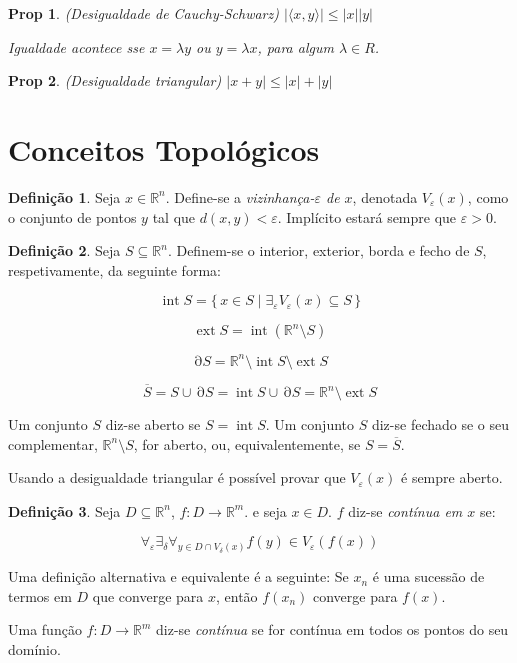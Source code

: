 \documentclass{article}
\DeclareMathOperator{\interior}{int}
\DeclareMathOperator{\exterior}{ext}
\DeclareMathOperator{\border}{\partial}
\newcommand{\R}{\mathbb{R}}
\newtheorem{prop}{Prop}
\theoremstyle{definition}
\newtheorem*{definition*}{Definição}
\begin{document}
	\begin{prop}
	(Desigualdade de Cauchy-Schwarz) $\lvert \langle x, y \rangle \rvert \leq \lvert x \rvert \lvert y \rvert$
	
	Igualdade acontece sse $x = \lambda y$ ou $y = \lambda x$, para algum $\lambda \in R$.
	\end{prop}
	
	\begin{prop}
	(Desigualdade triangular) $\lvert x + y \rvert \leq \lvert x \rvert + \lvert y \rvert$
	\end{prop}
	
	\section{Conceitos Topológicos}
	
	\begin{definition*}
	Seja $x \in \R^n$. Define-se a \emph{vizinhança-$\varepsilon$ de $x$}, denotada $V_\varepsilon(x)$, como o conjunto de pontos $y$ tal que $d(x, y) < \varepsilon$. Implícito estará sempre que $\varepsilon > 0$.
	\end{definition*}
	
	\begin{definition*}
	Seja $S \subseteq \R^n$. Definem-se o interior, exterior, borda e fecho de $S$, respetivamente, da seguinte forma:
	
	\[\interior S = \{\, x \in S \mid \exists_\varepsilon V_\varepsilon (x) \subseteq S\,\}\]
	
	\[\exterior S = \interior (\R^n \setminus S)\]
	
	\[\border S = \R^n \setminus \interior S \setminus \exterior S\]
	
	\[\overline S = S \cup \border S = \interior S \cup \border S = \R^n \setminus \exterior S\]
	
	Um conjunto $S$ diz-se aberto se $S = \interior S$. Um conjunto $S$ diz-se fechado se o seu complementar, $\R^n \setminus S$, for aberto, ou, equivalentemente, se $S = \overline S$.
	
	Usando a desigualdade triangular é possível provar que $V_\varepsilon(x)$ é sempre aberto.
	\end{definition*}
	
	\begin{definition*}
	Seja $D \subseteq \R^n$, $f : D \to \R^m$. e seja $x \in D$. $f$ diz-se \emph{contínua em $x$} se:
	
	\[\forall_\varepsilon \exists_\delta \forall_{y \in D \cap V_\delta(x)} f(y) \in V_\varepsilon(f(x))\]
	
	Uma definição alternativa e equivalente é a seguinte: Se $x_n$ é uma sucessão de termos em $D$ que converge para $x$, então $f(x_n)$ converge para $f(x)$.
	
	Uma função $f : D \to \R^m$ diz-se \emph{contínua} se for contínua em todos os pontos do seu domínio.
	\end{definition*}
	
\end{document}
